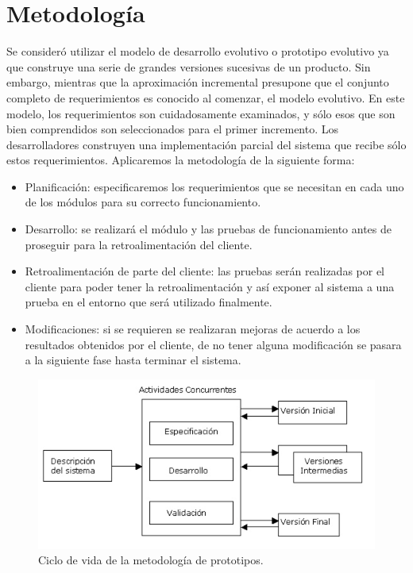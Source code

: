 \section{Metodología}

Se consideró utilizar el modelo de desarrollo evolutivo o prototipo evolutivo ya que construye una serie de grandes versiones
sucesivas de un producto. Sin embargo, mientras que la aproximación incremental presupone que el conjunto completo de
requerimientos es conocido al comenzar, el modelo evolutivo. En este modelo, los requerimientos son cuidadosamente
examinados, y sólo esos que son bien comprendidos son seleccionados para el primer incremento. Los desarrolladores construyen
una implementación parcial del sistema que recibe sólo estos requerimientos.
Aplicaremos la metodología de la siguiente forma:\\

\begin{itemize}
	\item Planificación: especificaremos los requerimientos que se necesitan en cada uno de los módulos para su correcto
funcionamiento.

	\item Desarrollo: se realizará el módulo y las pruebas de funcionamiento antes de proseguir para la retroalimentación del cliente.

	\item Retroalimentación de parte del cliente: las pruebas serán realizadas por el cliente para poder tener la retroalimentación y
así exponer al sistema a una prueba en el entorno que será utilizado finalmente.

	\item Modificaciones: si se requieren se realizaran mejoras de acuerdo a los resultados obtenidos por el cliente, de no tener
alguna modificación se pasara a la siguiente fase hasta terminar el sistema.\\

\end{itemize}


\begin{figure}
	\centering
	\includegraphics[scale=.7]{images/metodologia}
	\caption{Ciclo de vida de la metodología de prototipos.}
	\label{fig:metodologia}
\end{figure}


